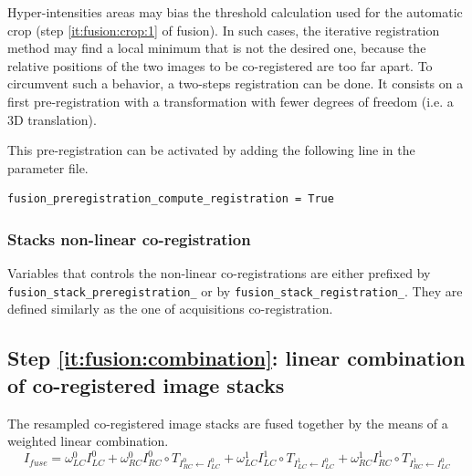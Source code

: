 Hyper-intensities areas may bias the threshold calculation used for the automatic crop (step \ref{it:fusion:crop:1} of fusion). In such cases, the iterative registration method may find a local minimum that is not the desired one, because the relative positions of the two images to be co-registered are too far apart. To circumvent such a behavior, a two-steps registration can be done. It consists on a first pre-registration with a transformation with fewer degrees of freedom (i.e. a 3D translation). 

This pre-registration can be activated by adding the following line in the parameter file.
\begin{verbatim}
fusion_preregistration_compute_registration = True
\end{verbatim}

\subsubsection{Stacks non-linear co-registration}
\label{sec:cli:fuse:stack:registration}
Variables that controls the non-linear co-registrations are either prefixed by \texttt{fusion\_stack\_preregistration\_} or by \texttt{fusion\_stack\_registration\_}. They are defined similarly as the one of acquisitions co-registration. 






\subsection{Step \ref{it:fusion:combination}: linear combination of co-registered image stacks}
\label{sec:cli:fuse:stack:fusion}

The resampled co-registered image stacks are fused together by the means of a weighted linear combination.
\begin{displaymath}
I_{fuse} =
\omega^{0}_{LC} I^{0}_{LC}
+ \omega^{0}_{RC} I^{0}_{RC} \circ T_{I^{0}_{RC} \leftarrow I^{0}_{LC}}
+ \omega^{1}_{LC} I^{1}_{LC} \circ T_{I^{1}_{LC} \leftarrow I^{0}_{LC}}
+ \omega^{1}_{RC} I^{1}_{RC} \circ T_{I^{1}_{RC} \leftarrow I^{0}_{LC}}
\end{displaymath}



